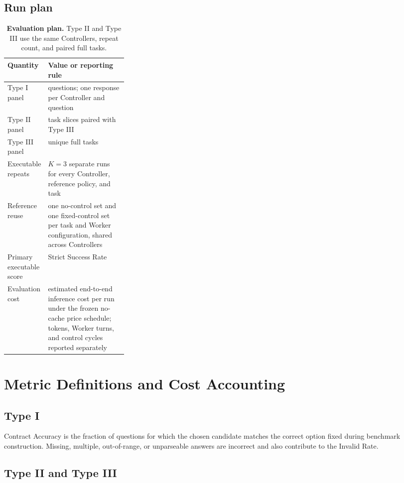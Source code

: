 \subsection{Run plan}

\begin{table}[H]
\caption{\textbf{Evaluation plan.} Type II and Type III use the same Controllers, repeat count, and paired full tasks.}
\label{tab:manifest-commitments}
\centering
\small
\begin{tabularx}{\linewidth}{@{}>{\raggedright\arraybackslash}p{0.28\linewidth}>{\raggedright\arraybackslash}X@{}}
\toprule
Quantity & Value or reporting rule \\
\midrule
Type I panel & \NumTypeI{} questions; one response per Controller and question \\
Type II panel & \NumTypeII{} task slices paired with Type III \\
Type III panel & \NumTypeIII{} unique full tasks \\
Executable repeats & \(K=3\) separate runs for every Controller, reference policy, and task \\
Reference reuse & one no-control set and one fixed-control set per task and Worker configuration, shared across Controllers \\
Primary executable score & Strict Success Rate \\
Evaluation cost & estimated end-to-end inference cost per run under the frozen no-cache price schedule; tokens, Worker turns, and control cycles reported separately \\
\bottomrule
\end{tabularx}
\end{table}

\section{Metric Definitions and Cost Accounting}
\label{app:statistics}

\subsection{Type I}

Contract Accuracy is the fraction of questions for which the chosen candidate matches the correct option fixed during benchmark construction. Missing, multiple, out-of-range, or unparseable answers are incorrect and also contribute to the Invalid Rate.

\subsection{Type II and Type III}

